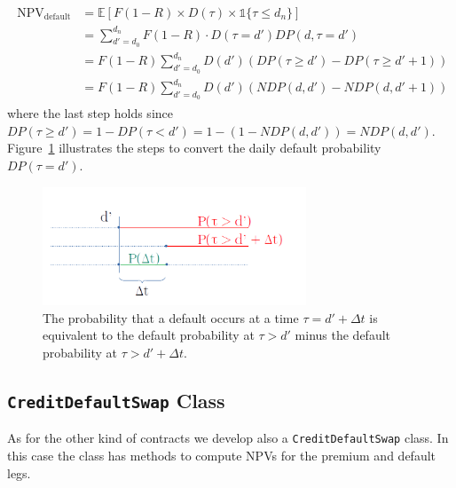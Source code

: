\begin{align}
\begin{split}
\mathrm{NPV_{default}} &= \mathbb{E}[F(1-R) \times D(\tau) \times \mathbb{1}\{\tau \leq d_n\} ] \\
&= \sum_{d'=d_0}^{d_n} F(1-R) \cdot D(\tau = d') DP(d, \tau = d') \\
&= F(1-R) \sum_{d'=d_0}^{d_n} D(d') \left(DP(\tau \geq d') - DP( \tau \geq d'+1) \right) \\
&= F(1-R) \sum_{d'=d_0}^{d_n} D(d') \left( NDP(d, d') - NDP(d, d'+1) \right)
\end{split}
\end{align}
where the last step holds since $DP(\tau\geq d') = 1 - DP(\tau < d') = 1 - (1-NDP(d, d')) = NDP(d, d')$. 
Figure~\ref{fig:default_p} illustrates the steps to convert the daily default probability $DP(\tau=d')$.

\begin{figure}[htb]
\centering
\includegraphics[width=0.7\textwidth]{figures/timeline.png}
\caption{The probability that a default occurs at a time $\tau = d'+\Delta t$ is equivalent to the default probability at $\tau > d'$ minus the default probability at $\tau>d'+\Delta t$.}
\label{fig:default_p}
\end{figure}

\subsection{\texttt{CreditDefaultSwap} Class}

As for the other kind of contracts we develop also a \texttt{CreditDefaultSwap} class. In this case the class has methods to compute NPVs for the premium and default legs.

